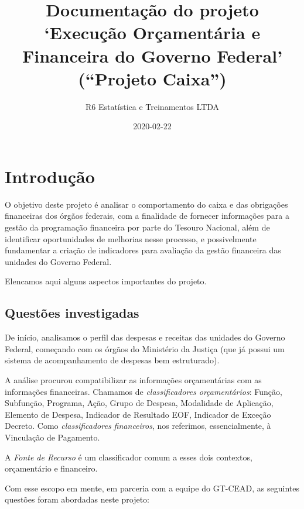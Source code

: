 \documentclass[
]{book}
\title{Documentação do projeto `Execução Orçamentária e Financeira do Governo Federal' (``Projeto Caixa'')}
\author{R6 Estatística e Treinamentos LTDA}
\date{2020-02-22}
\begin{document}
\frontmatter
\maketitle

{
\setcounter{tocdepth}{1}
\tableofcontents
}
\mainmatter
\hypertarget{introduuxe7uxe3o}{%
\chapter{Introdução}\label{introduuxe7uxe3o}}

O objetivo deste projeto é analisar o comportamento do caixa e das obrigações financeiras dos órgãos federais, com a finalidade de fornecer informações para a gestão da programação financeira por parte do Tesouro Nacional, além de identificar oportunidades de melhorias nesse processo, e possivelmente fundamentar a criação de indicadores para avaliação da gestão financeira das unidades do Governo Federal.

Elencamos aqui alguns aspectos importantes do projeto.

\hypertarget{questuxf5es-investigadas}{%
\section{Questões investigadas}\label{questuxf5es-investigadas}}

De início, analisamos o perfil das despesas e receitas das unidades do Governo Federal, começando com os órgãos do Ministério da Justiça (que já possui um sistema de acompanhamento de despesas bem estruturado).

A análise procurou compatibilizar as informações orçamentárias com as informações financeiras. Chamamos de \emph{classificadores orçamentários}: Função, Subfunção, Programa, Ação, Grupo de Despesa, Modalidade de Aplicação, Elemento de Despesa, Indicador de Resultado EOF, Indicador de Exceção Decreto. Como \emph{classificadores financeiros}, nos referimos, essencialmente, à Vinculação de Pagamento.

A \emph{Fonte de Recurso} é um classificador comum a esses dois contextos, orçamentário e financeiro.

Com esse escopo em mente, em parceria com a equipe do GT-CEAD, as seguintes questões foram abordadas neste projeto:
\end{document}
